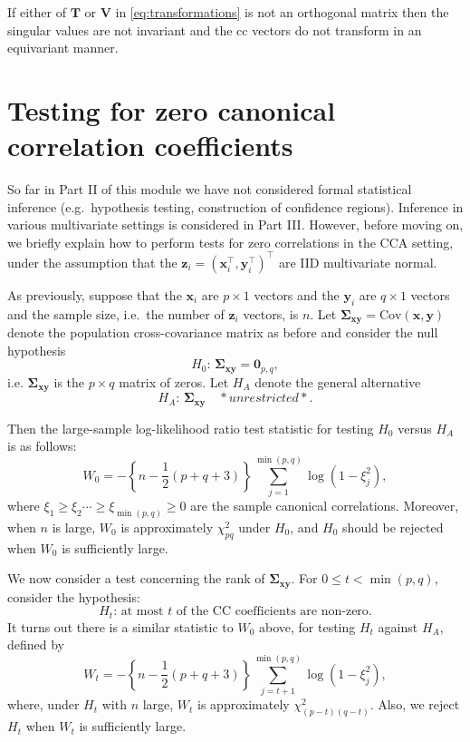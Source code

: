 \documentclass[]{book}
\theoremstyle{definition}
\theoremstyle{definition}
\theoremstyle{definition}
\theoremstyle{remark}
\begin{document}
If either of \(\mathbf T\) or \(\mathbf V\) in \eqref{eq:transformations} is not an orthogonal matrix then the singular values are not invariant and the cc vectors do not transform in an equivariant manner.

\hypertarget{testing-for-zero-canonical-correlation-coefficients}{%
\section{Testing for zero canonical correlation coefficients}\label{testing-for-zero-canonical-correlation-coefficients}}

So far in Part II of this module we have not considered formal statistical inference (e.g.~hypothesis testing, construction of confidence regions). Inference in various multivariate settings is considered in Part III. However, before moving on, we briefly explain how to perform tests for zero correlations in the CCA setting, under the assumption that the \(\boldsymbol z_i = (\boldsymbol x_i^\top , \boldsymbol y_i^\top)^\top\) are IID multivariate normal.

As previously, suppose that the \(\boldsymbol x_i\) are \(p \times 1\) vectors and the \(\boldsymbol y_i\) are \(q \times 1\) vectors and the sample size, i.e.~the number of \(\boldsymbol z_i\) vectors, is \(n\). Let \(\boldsymbol \Sigma_{\boldsymbol x\boldsymbol y} =\text{Cov}(\boldsymbol x,\boldsymbol y)\) denote the population cross-covariance matrix as before and consider the null hypothesis
\[
H_0: \, \boldsymbol \Sigma_{\boldsymbol x\boldsymbol y}={\mathbf 0}_{p,q},
\]
i.e. \(\boldsymbol \Sigma_{\boldsymbol x\boldsymbol y}\) is the \(p \times q\) matrix of zeros. Let \(H_A\) denote the general alternative
\[
H_A:\, \boldsymbol \Sigma_{\boldsymbol x\boldsymbol y} \quad *unrestricted*.
\]

Then the large-sample log-likelihood ratio test statistic for testing \(H_0\) versus \(H_A\) is as follows:
\[
W_0=-\left \{n-\frac{1}{2}(p+q+3)  \right \}\sum_{j=1}^{\min(p,q)} \log (1-\xi_j^2),
\]
where \(\xi_1\geq \xi_2 \cdots \geq \xi_{\min(p,q)} \geq 0\) are the sample canonical correlations.
Moreover, when \(n\) is large, \(W_0\) is approximately \(\chi_{pq}^2\) under \(H_0\), and \(H_0\) should be rejected
when \(W_0\) is sufficiently large.

We now consider a test concerning the rank of \(\boldsymbol \Sigma_{\boldsymbol x\boldsymbol y}\). For \(0 \leq t <\min(p,q)\), consider the hypothesis:
\[
H_t: \,   \text{at most $t$ of the CC coefficients are non-zero}.
\]
It turns out there is a similar statistic to \(W_0\) above, for testing \(H_t\) against \(H_A\), defined by
\[
W_t=-\left \{n-\frac{1}{2}(p+q+3)  \right \}\sum_{j=t+1}^{\min(p,q)} \log (1-\xi_j^2),
\]
where, under \(H_t\) with \(n\) large, \(W_t\) is approximately \(\chi_{(p-t)(q-t)}^2\). Also, we reject
\(H_t\) when \(W_t\) is sufficiently large.
\end{document}
